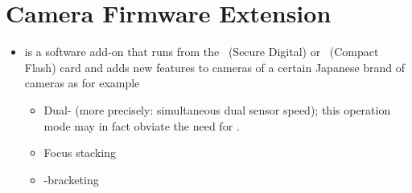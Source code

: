 \section[Camera Firmware Extension]{\label{sec:camera-firmware-extension}%
  Camera Firmware Extension}

\begin{itemize}
  \label{app:magiclantern}
\item
   is a software add-on that runs
  from the ~(Secure Digital) or ~(Compact Flash) card and adds new
  features to cameras of a certain Japanese brand of cameras as for example

  \begin{itemize}
  \item
    Dual- (more precisely: simultaneous dual
    sensor speed); this operation mode may in fact obviate the need for .

  \item
    Focus stacking

  \item
    -bracketing
  \end{itemize}
\end{itemize}



